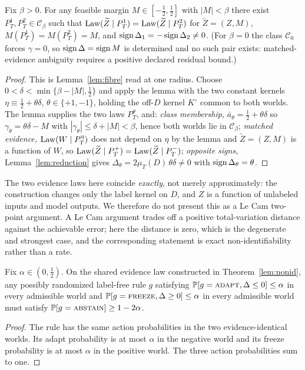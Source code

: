 \begin{theorem}\label{lem:nonid}
Fix $\beta>0$. For any feasible margin $M\in[-\tfrac12,\tfrac12]$ with $|M|<\beta$ there exist
$P_T^1,P_T^2\in\mathcal{C}_\beta$ such
that $\mathrm{Law}(\widetilde Z\mid P_T^1)=\mathrm{Law}(\widetilde Z\mid P_T^2)$ for
$\widetilde Z=(Z,M)$, $M(P_T^1)=M(P_T^2)=M$, and
$\operatorname{sign}\Delta_1=-\operatorname{sign}\Delta_2\neq0$. (For $\beta=0$ the class
$\mathcal{C}_0$ forces $\gamma=0$, so $\operatorname{sign}\Delta=\operatorname{sign} M$
is determined and no such pair exists: matched-evidence ambiguity requires a positive
declared residual bound.)
\end{theorem}
\begin{proof}
This is Lemma~\ref{lem:fibre} read at one radius. Choose
$0<\delta<\min\{\beta-|M|,\tfrac12\}$ and apply the lemma with the two constant kernels
$\eta\equiv\tfrac12+\theta\delta$, $\theta\in\{+1,-1\}$, holding the off-$D$ kernel $K^\circ$
common to both worlds. The lemma supplies the two laws $P_T^\theta$, and:
\emph{class membership,} $\bar a_\theta=\tfrac12+\theta\delta$ so
$\gamma_\theta=\theta\delta-M$ with $|\gamma_\theta|\le\delta+|M|<\beta$, hence both worlds lie
in $\mathcal C_\beta$; \emph{matched evidence,} $\mathrm{Law}(W\mid P_T^\eta)$ does not depend on $\eta$
by the lemma and $\widetilde Z=(Z,M)$ is a function of $W$, so
$\mathrm{Law}(\widetilde Z\mid P_T^{+})=\mathrm{Law}(\widetilde Z\mid P_T^{-})$; \emph{opposite signs,}
Lemma~\ref{lem:reduction} gives $\Delta_\theta=2\mu_T(D)\,\theta\delta\neq0$ with
$\operatorname{sign}\Delta_\theta=\theta$.
\end{proof}
\noindent The two evidence laws here coincide \emph{exactly}, not merely approximately: the
construction changes only the label kernel on $D$, and $Z$ is a function of unlabeled inputs and
model outputs. We therefore do not present this as a Le Cam two-point argument. A Le Cam argument
trades off a positive total-variation distance against the achievable error; here the distance is
zero, which is the degenerate and strongest case, and the corresponding statement is exact
non-identifiability rather than a rate.

\begin{corollary}\label{cor:matched-abstain}
Fix $\alpha\in(0,\tfrac12)$. On the shared evidence law constructed in
Theorem~\ref{lem:nonid}, any possibly randomized label-free rule $g$ satisfying
$\mathbb{P}[g=\textnormal{\textsc{adapt}},\Delta\le0]\le\alpha$ in every admissible world and
$\mathbb{P}[g=\textnormal{\textsc{freeze}},\Delta\ge0]\le\alpha$ in every admissible world must satisfy
$\mathbb{P}[g=\textnormal{\textsc{abstain}}]\ge1-2\alpha$.
\end{corollary}
\begin{proof}
The rule has the same action probabilities in the two evidence-identical worlds. Its adapt
probability is at most $\alpha$ in the negative world and its freeze probability is at most
$\alpha$ in the positive world. The three action probabilities sum to one.
\end{proof}

